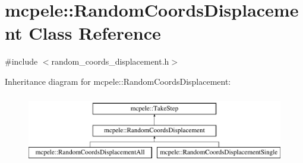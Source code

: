 \hypertarget{classmcpele_1_1RandomCoordsDisplacement}{\section{mcpele\-:\-:\-Random\-Coords\-Displacement \-Class \-Reference}
\label{classmcpele_1_1RandomCoordsDisplacement}
}


{\ttfamily \#include $<$random\-\_\-coords\-\_\-displacement.\-h$>$}

\-Inheritance diagram for mcpele\-:\-:\-Random\-Coords\-Displacement\-:\begin{figure}[H]
\begin{center}
\leavevmode
\includegraphics[height=3.000000cm]{classmcpele_1_1RandomCoordsDisplacement}
\end{center}
\end{figure}
